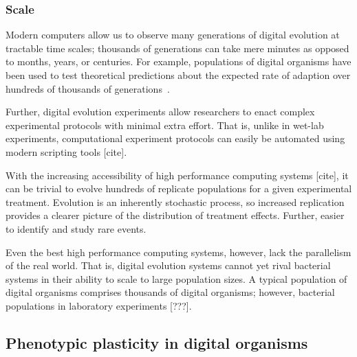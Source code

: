 
\subsubsection{Scale}

Modern computers allow us to observe many generations of digital evolution at tractable time scales; thousands of generations can take mere minutes as opposed to months, years, or centuries.
For example, populations of digital organisms have been used to test theoretical predictions about the expected rate of adaption over hundreds of thousands of generations~\citep{wiser_analysis_2015,wiser_boundedness_2018}.

Further, digital evolution experiments allow researchers to enact complex experimental protocols with minimal extra effort. 
That is, unlike in wet-lab experiments, computational experiment protocols can easily be automated using modern scripting tools [cite].

With the increasing accessibility of high performance computing systems [cite], it can be trivial to evolve hundreds of replicate populations for a given experimental treatment. 
Evolution is an inherently stochastic process, so increased replication provides a clearer picture of the distribution of treatment effects. 
Further, easier to identify and study rare events.

Even the best high performance computing systems, however, lack the parallelism of the real world.
That is, digital evolution systems cannot yet rival bacterial systems in their ability to scale to large population sizes. 
A typical population of digital organisms comprises thousands of digital organisms; however, bacterial populations in laboratory experiments [???]. 

\subsection{Phenotypic plasticity in digital organisms}

